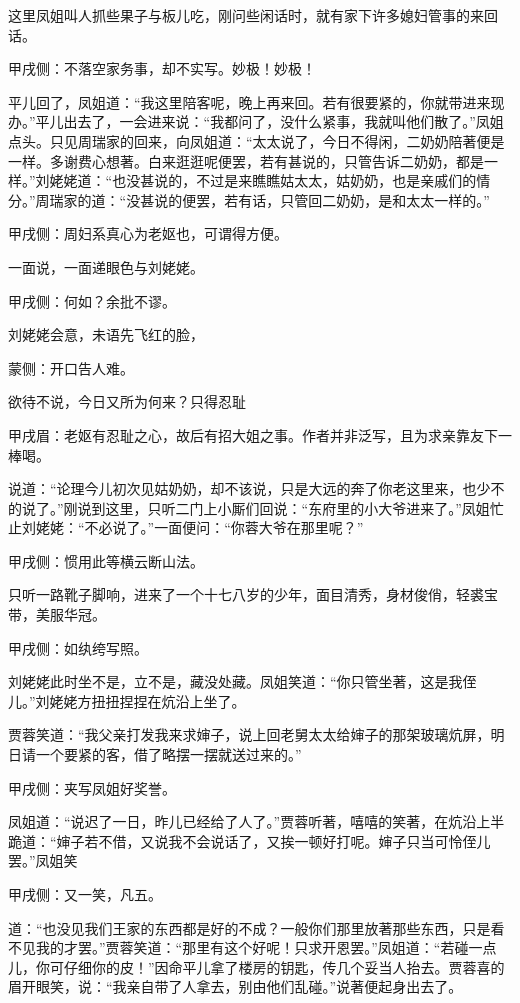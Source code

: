 \begin{parag}
    这里凤姐叫人抓些果子与板儿吃，刚问些闲话时，就有家下许多媳妇管事的来回话。\begin{note}甲戌侧：不落空家务事，却不实写。妙极！妙极！\end{note}平儿回了，凤姐道：“我这里陪客呢，晚上再来回。若有很要紧的，你就带进来现办。”平儿出去了，一会进来说：“我都问了，没什么紧事，我就叫他们散了。”凤姐点头。只见周瑞家的回来，向凤姐道：“太太说了，今日不得闲，二奶奶陪著便是一样。多谢费心想著。白来逛逛呢便罢，若有甚说的，只管告诉二奶奶，都是一样。”刘姥姥道：“也没甚说的，不过是来瞧瞧姑太太，姑奶奶，也是亲戚们的情分。”周瑞家的道：“没甚说的便罢，若有话，只管回二奶奶，是和太太一样的。”\begin{note}甲戌侧：周妇系真心为老妪也，可谓得方便。\end{note}一面说，一面递眼色与刘姥姥。\begin{note}甲戌侧：何如？余批不谬。\end{note}刘姥姥会意，未语先飞红的脸，\begin{note}蒙侧：开口告人难。\end{note}欲待不说，今日又所为何来？只得忍耻\begin{note}甲戌眉：老妪有忍耻之心，故后有招大姐之事。作者并非泛写，且为求亲靠友下一棒喝。\end{note}说道：“论理今儿初次见姑奶奶，却不该说，只是大远的奔了你老这里来，也少不的说了。”刚说到这里，只听二门上小厮们回说：“东府里的小大爷进来了。”凤姐忙止刘姥姥：“不必说了。”一面便问：“你蓉大爷在那里呢？”\begin{note}甲戌侧：惯用此等横云断山法。\end{note}只听一路靴子脚响，进来了一个十七八岁的少年，面目清秀，身材俊俏，轻裘宝带，美服华冠。\begin{note}甲戌侧：如纨绔写照。\end{note}刘姥姥此时坐不是，立不是，藏没处藏。凤姐笑道：“你只管坐著，这是我侄儿。”刘姥姥方扭扭捏捏在炕沿上坐了。
\end{parag}


\begin{parag}
    贾蓉笑道：“我父亲打发我来求婶子，说上回老舅太太给婶子的那架玻璃炕屏，明日请一个要紧的客，借了略摆一摆就送过来的。”\begin{note}甲戌侧：夹写凤姐好奖誉。\end{note}凤姐道：“说迟了一日，昨儿已经给了人了。”贾蓉听著，嘻嘻的笑著，在炕沿上半跪道：“婶子若不借，又说我不会说话了，又挨一顿好打呢。婶子只当可怜侄儿罢。”凤姐笑\begin{note}甲戌侧：又一笑，凡五。\end{note}道：“也没见我们王家的东西都是好的不成？一般你们那里放著那些东西，只是看不见我的才罢。”贾蓉笑道：“那里有这个好呢！只求开恩罢。”凤姐道：“若碰一点儿，你可仔细你的皮！”因命平儿拿了楼房的钥匙，传几个妥当人抬去。贾蓉喜的眉开眼笑，说：“我亲自带了人拿去，别由他们乱碰。”说著便起身出去了。
\end{parag}


